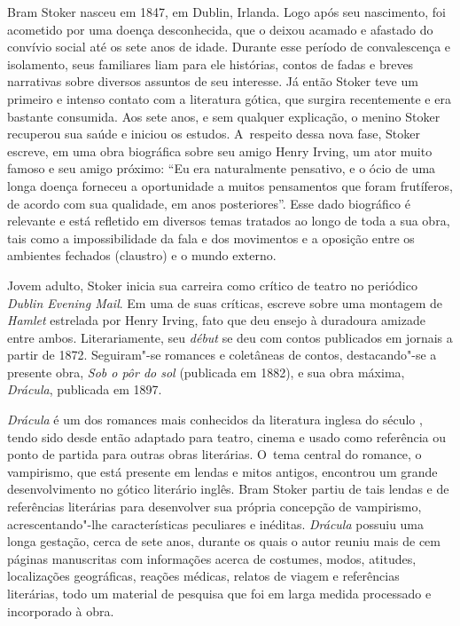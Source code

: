 Bram Stoker nasceu em 1847, em Dublin, Irlanda. Logo após seu
nascimento, foi acometido por uma doença desconhecida, que o deixou
acamado e afastado do convívio social até os sete anos de idade. Durante
esse período de convalescença e isolamento, seus familiares liam para
ele histórias, contos de fadas e breves narrativas sobre diversos
assuntos de seu interesse. Já então Stoker teve um primeiro e
intenso contato com a literatura gótica, que surgira recentemente e era
bastante consumida. Aos sete anos, e sem qualquer explicação, o menino
Stoker recuperou sua saúde e iniciou os estudos. A~respeito dessa nova
fase, Stoker escreve, em uma obra biográfica sobre seu amigo Henry
Irving, um ator muito famoso e seu amigo próximo: ``Eu era naturalmente
pensativo, e o ócio de uma longa doença forneceu a oportunidade a muitos
pensamentos que foram frutíferos, de acordo com sua qualidade, em anos
posteriores''. Esse dado biográfico é relevante e está refletido em
diversos temas tratados ao longo de toda a sua obra, tais como a
impossibilidade da fala e dos movimentos e a oposição entre os ambientes
fechados (claustro) e o mundo externo.

Jovem adulto, Stoker inicia sua carreira como crítico de teatro no
periódico \emph{Dublin Evening Mail}. Em uma de suas críticas, escreve
sobre uma montagem de \emph{Hamlet} estrelada por Henry Irving, fato que
deu ensejo à duradoura amizade entre ambos. Literariamente, seu
\emph{début} se deu com contos publicados em jornais a partir de 1872.
Seguiram"-se romances e coletâneas de contos, destacando"-se a presente
obra, \emph{Sob o pôr do sol} (publicada em 1882), e sua obra máxima,
\emph{Drácula}, publicada em 1897.

\emph{Drácula} é um dos romances mais conhecidos da literatura inglesa
do século , tendo sido desde então adaptado para teatro, cinema e
usado como referência ou ponto de partida para outras obras literárias.
O~tema central do romance, o vampirismo, que está presente em lendas e
mitos antigos, encontrou um grande desenvolvimento no gótico literário
inglês. Bram Stoker partiu de tais lendas e de referências literárias
para desenvolver sua própria concepção de vampirismo, acrescentando"-lhe
características peculiares e inéditas. \emph{Drácula} possuiu uma longa
gestação, cerca de sete anos, durante os quais o autor reuniu mais de
cem páginas manuscritas com informações acerca de costumes, modos,
atitudes, localizações geográficas, reações médicas, relatos de viagem e
referências literárias, todo um material de pesquisa que foi em larga
medida processado e incorporado à obra.


